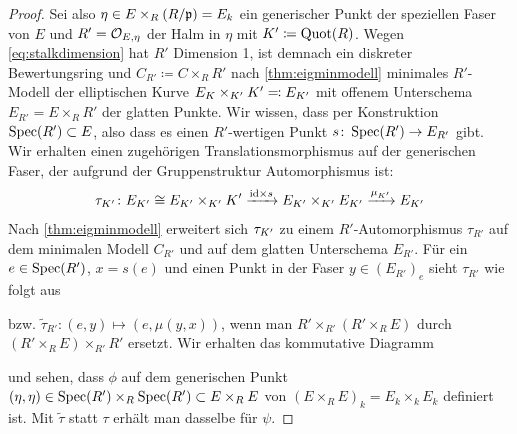 \begin{Lemma}
\begin{proof}
    Sei also $\eta\in E\times_R (R/\mathfrak{p})=E_k$ ein generischer Punkt der
    speziellen Faser von $E$ und $R'=\mathcal{O}_{E,\eta}$ der Halm in
    $\eta$ mit $K'\coloneqq\operatorname{Quot}(R)$. %
    Wegen \ref{eq:stalkdimension} hat $R'$
    Dimension 1, ist demnach ein diskreter Bewertungsring und
    $C_{R'}\coloneqq C\times_R R'$ nach \ref{thm:eigminmodell}
    minimales $R'$-Modell der elliptischen Kurve
    $E_{K}\times_{K'}K'\eqqcolon E_{K'}$ mit offenem Unterschema
    $E_{R'}=E\times_R R'$ der glatten Punkte.
    Wir wissen, dass per Konstruktion $\operatorname{Spec}(R')\subset E$, also dass
    es einen $R'$-wertigen Punkt $s\colon\operatorname{Spec}(R')\to E_{R'}$ gibt.
    Wir erhalten einen zugehörigen Translationsmorphismus auf der
    generischen Faser, der aufgrund der Gruppenstruktur Automorphismus
    ist:
    \begin{gather*}
      \tau_{K'}\colon
      E_{K'}\cong E_{K'}\times_{K'}K'
      \xrightarrow{\mathrm{id}\times s}
      E_{K'}\times_{K'}E_{K'}
      \xrightarrow{\mu_{K'}}
      E_{K'}
    \end{gather*}
    Nach \ref{thm:eigminmodell} erweitert sich $\tau_{K'}$ zu
    einem $R'$-Automorphismus $\tau_{R'}$ auf dem minimalen Modell
    $C_{R'}$ und auf dem glatten Unterschema $E_{R'}$.
    Für ein $e\in\operatorname{Spec}(R')$, $x=s(e)$ und einen Punkt in der Faser
    $y\in(E_{R'})_e$ sieht $\tau_{R'}$ wie folgt aus
    \begin{center}
    \end{center}
    bzw. $\tilde\tau_{R'}\colon(e,y)\mapsto(e,\mu(y,x))$, wenn man
    $R'\times_{R'}(R'\times_R E)$ durch $(R'\times_R E)\times_{R'}R'$ ersetzt.
    Wir erhalten das kommutative Diagramm
    \begin{center}
    \end{center}
    und sehen, dass $\phi$ auf dem generischen Punkt
    $(\eta,\eta)\in\operatorname{Spec}(R')\times_R\operatorname{Spec}(R')\subset E\times_R E$
    von $(E\times_R E)_k=E_k\times_k E_k$ definiert ist.
    Mit $\tilde\tau$ statt $\tau$ erhält man dasselbe für $\psi$.

\end{proof}
\end{Lemma}
